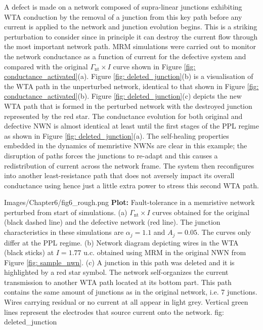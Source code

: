 A defect is made on a network composed of supra-linear junctions exhibiting WTA conduction by the removal of a junction from this key path before any current is applied to the network and junction evolution begins. This is a striking  perturbation to consider since in principle it can destroy the current flow through the most important network path. MRM simulations were carried out to monitor the network conductance as a function of current for the defective system and compared with the original $\Gamma_{\textrm{nt}}\times I$ curve shown in Figure \ref{fig: conductance_activated}(a). Figure \ref{fig: deleted_junction}(b) is a visualisation of the WTA path in the unperturbed network, identical to that shown in Figure \ref{fig: conductance_activated}(b). Figure \ref{fig: deleted_junction}(c) depicts the new WTA path that is formed in the perturbed network with the destroyed junction represented by the red star. The conductance evolution for both original and defective NWN is almost identical at least until the first stages of the PPL regime as shown in Figure \ref{fig: deleted_junction}(a). The self-healing properties embedded in the dynamics of memristive NWNs are clear in this example; the disruption of paths forces the junctions to re-adapt and this causes a redistribution of current across the network frame. The system then reconfigures into another least-resistance path that does not aversely impact its overall conductance using hence just a little extra power to stress this second WTA path.

{Images/Chapter6/fig6_rough.png}
{\textbf{Plot:}  Fault-tolerance in a memristive network perturbed from start of simulations.}
{(a) $\Gamma_{\textrm{nt}} \times I$ curves obtained for the original (black dashed line) and the defective network (red line). The junction characteristics in these simulations are $\alpha_j=1.1$ and $A_j=0.05$. The curves only differ at the PPL regime. (b) Network diagram depicting wires in the WTA (black sticks) at $I = 1.77$ u.c. obtained using MRM in the original NWN from Figure \ref{fig: sample_nwn}. (c) A junction in this path was deleted and it is highlighted by a red star symbol. The network self-organizes the current transmission to another WTA path located at its bottom part. This path contains the same amount of junctions as in the original network, i.e. 7 junctions. Wires carrying residual or no current at all appear in light grey. Vertical green lines represent the electrodes that source current onto the network\cite{ocallaco2018}.}
{fig: deleted_junction}

